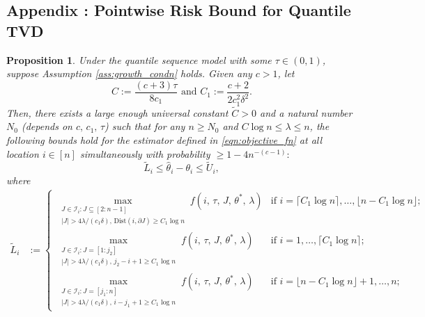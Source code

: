\documentclass[11pt]{article}
\theoremstyle{plain}
\newtheorem{proposition}{Proposition}
\theoremstyle{definition}
\theoremstyle{remark}
\begin{document}
\begin{appendix}
\section*{Appendix \thesection: Pointwise Risk Bound for Quantile TVD}\label{appnc}
    \begin{proposition}\label{prop:ptwise_error_bound}
 Under the quantile sequence model with some $\tau \in (0,1)$, suppose Assumption \ref{ass:growth_condn} holds. Given any $c>1$, let $$C:=\frac{(c+3)\tau}{8c_1} \text{ and }C_1:=\frac{c+2}{2c_1^2\delta^2}.$$
   Then, there exists a large enough universal constant $\tilde{C}>0$ and a natural number $N_0$ (depends on $c,\, c_1,\,\tau$) such that for any $n\geq N_0$ and $C\log n\leq \lambda \leq n$, the following bounds hold for the estimator defined in \eqref{eqn:objective_fn} at \textit{all location} $i\in [n]$ \textit{simultaneously} with probability $\geq 1-4n^{-(c-1)}:$
    \[\tilde{L}_i\leq \hat{\theta}_i-\theta_i\leq \tilde{U}_i,\]
    where
    \begin{align*}
\tilde{L}_i &:= 
\begin{cases}
\displaystyle \max_{\substack{J \in \mathcal{I}_i: J \subseteq [2:n-1] \\ |J| > 4\lambda/(c_1\delta),\, \text{Dist}(i, \partial J) \ge C_1 \log n}} f\left(i,\,\tau,\, J,\, \theta^*,\,\lambda\right) & \text{if } i=\lceil C_1 \log n\rceil,\ldots, \lfloor n - C_1 \log n\rfloor; \\[2.5em]
\displaystyle \max_{\substack{J \in \mathcal{I}_i: J = [1:j_2] \\ |J| > 4\lambda/(c_1\delta),\, j_2 - i + 1 \ge C_1 \log n}} f\left(i,\,\tau,\, J,\, \theta^*,\,\lambda\right) & \text{if } i=1,\ldots,\lceil C_1 \log n\rceil; \\[2.5em]
\displaystyle \max_{\substack{J \in \mathcal{I}_i: J = [j_1:n] \\ |J| > 4\lambda/(c_1\delta),\, i - j_1 + 1 \ge C_1 \log n}} f\left(i,\,\tau,\, J,\, \theta^*,\,\lambda\right) & \text{if } i=\lfloor n - C_1 \log n \rfloor +1,\ldots,n;
\end{cases}

\end{align*}
\end{proposition}
\end{appendix}
\end{document}
